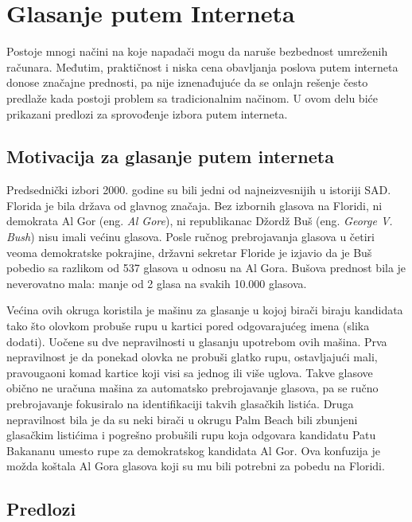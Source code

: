 \documentclass[a4paper]{article}
\theoremstyle{break}
\begin{document}
{\section{Glasanje putem Interneta}
\label{sec:glasanje}

Postoje mnogi načini na koje napadači mogu da naruše bezbednost umreženih računara. Međutim, praktičnost i niska cena obavljanja poslova putem interneta donose značajne prednosti, pa nije iznenađujuće da se onlajn rešenje često predlaže kada postoji problem sa tradicionalnim načinom. U ovom delu biće prikazani predlozi za sprovođenje izbora putem interneta.

\subsection{Motivacija za glasanje putem interneta}
\label{subsec:Motivacija za glasanje putem interneta}

Predsednički izbori 2000. godine su bili jedni od najneizvesnijih u istoriji SAD. Florida je bila država od glavnog značaja. Bez izbornih glasova na Floridi, ni demokrata Al Gor (eng. {\em Al Gore}), ni republikanac Džordž Buš (eng. {\em George V. Bush}) nisu imali većinu glasova. Posle ručnog prebrojavanja glasova u četiri veoma demokratske pokrajine, državni sekretar Floride je izjavio da je Buš pobedio sa razlikom od 537 glasova u odnosu na Al Gora. Bušova prednost bila je neverovatno mala: manje od 2 glasa na svakih 10.000 glasova.

Većina ovih okruga koristila je mašinu za glasanje u kojoj birači biraju kandidata tako što olovkom probuše rupu u kartici pored odgovarajućeg imena (slika dodati). Uočene su dve nepravilnosti u glasanju upotrebom ovih mašina. Prva nepravilnost je da ponekad olovka ne probuši glatko rupu, ostavljajući mali, pravougaoni komad kartice koji visi sa jednog ili više uglova. Takve glasove obično ne uračuna mašina za automatsko prebrojavanje glasova, pa se ručno prebrojavanje fokusiralo na identifikaciji takvih glasačkih listića. Druga nepravilnost bila je da su neki birači u okrugu Palm Beach bili zbunjeni glasačkim listićima i pogrešno probušili rupu koja odgovara kandidatu Patu Bakananu umesto rupe za demokratskog kandidata Al Gor. Ova konfuzija je možda koštala Al Gora glasova koji su mu bili potrebni za pobedu na Floridi.

\subsection{Predlozi}
\label{subsec:Predlozi}

}
\end{document}
